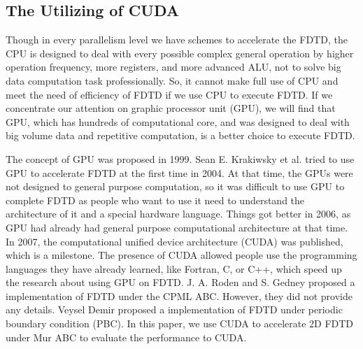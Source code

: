 \subsection{The Utilizing of CUDA}
Though in every parallelism level we have schemes to accelerate the FDTD, the CPU is designed to deal with every possible complex general operation by higher operation frequency, more registers, and more advanced ALU, not to solve big data computation task professionally. So, it cannot make full use of CPU and meet the need of efficiency of FDTD if we use CPU to execute FDTD. If we concentrate our attention on graphic processor unit (GPU), we will find that GPU, which has hundreds of computational core, and was designed to deal with big volume data and repetitive computation, is a better choice to execute FDTD.

The concept of GPU was proposed in 1999. Sean E. Krakiwsky et al.\cite{Krakiwsky} tried to use GPU to accelerate FDTD at the first time in 2004. At that time, the GPUs were not designed to general purpose computation, so it was difficult to use GPU to complete FDTD as people who want to use it need to understand the architecture of it and a special hardware language. Things got better in 2006, as GPU had already had general purpose computational architecture at that time. In 2007, the computational unified device architecture (CUDA) was published, which is a milestone. The presence of CUDA allowed people use the programming languages they have already learned, like Fortran, C, or C++, which speed up the research about using GPU on FDTD. J. A. Roden and S. Gedney\cite{Roden} proposed a implementation of FDTD under the CPML ABC. However, they did not provide any details. Veysel Demir \cite{Demir} proposed a implementation of FDTD under periodic boundary condition (PBC). In this paper, we use CUDA to accelerate 2D FDTD under Mur ABC to evaluate the performance to CUDA.

